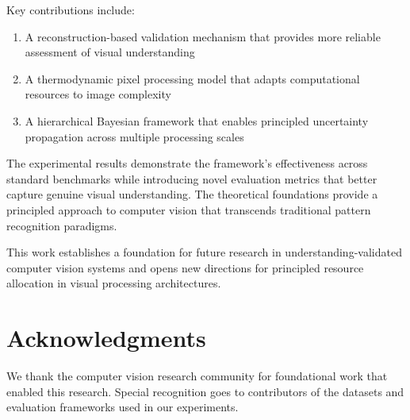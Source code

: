 \documentclass[12pt,a4paper]{article}
\begin{document}
Key contributions include:

\begin{enumerate}
\item A reconstruction-based validation mechanism that provides more reliable assessment of visual understanding
\item A thermodynamic pixel processing model that adapts computational resources to image complexity
\item A hierarchical Bayesian framework that enables principled uncertainty propagation across multiple processing scales
\end{enumerate}

The experimental results demonstrate the framework's effectiveness across standard benchmarks while introducing novel evaluation metrics that better capture genuine visual understanding. The theoretical foundations provide a principled approach to computer vision that transcends traditional pattern recognition paradigms.

This work establishes a foundation for future research in understanding-validated computer vision systems and opens new directions for principled resource allocation in visual processing architectures.

\section{Acknowledgments}

We thank the computer vision research community for foundational work that enabled this research. Special recognition goes to contributors of the datasets and evaluation frameworks used in our experiments.
\end{document}

